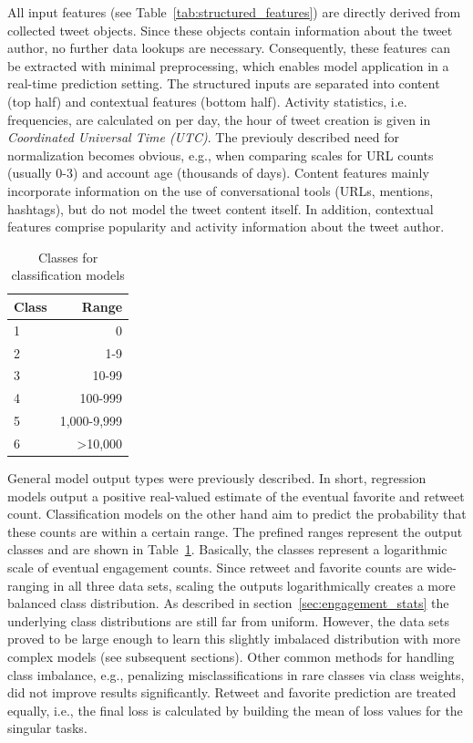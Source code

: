 All input features (see Table~\ref{tab:structured_features}) are directly derived
from collected tweet objects.
Since these objects contain information about the tweet author, no further data lookups
are necessary.
Consequently, these features can be extracted with minimal preprocessing, which
enables model application in a real-time prediction setting.
The structured inputs are separated into content (top half) and contextual
features (bottom half).
Activity statistics, i.e. frequencies, are calculated on per day,
the hour of tweet creation is given in \textit{Coordinated Universal Time (UTC)}.
The previouly described need for normalization becomes obvious, e.g., when
comparing scales for URL counts (usually 0-3) and account age (thousands of days).
Content features mainly incorporate information on the use of conversational
tools (URLs, mentions, hashtags), but do not model the tweet content itself.
In addition, contextual features comprise popularity and activity information
about the tweet author.

\begin{table}
  \begin{tabular}{lr}
    \toprule
    Class & Range \\
    \midrule
    1 & 0 \\
    2 & 1-9 \\
    3 & 10-99 \\
    4 & 100-999 \\
    5 & 1,000-9,999 \\
    6 & >10,000 \\
    \bottomrule
  \end{tabular}
  \caption{Classes for classification models}
  \label{tab:classification_buckets}
\end{table}

General model output types were previously described.
In short, regression models output a positive real-valued estimate of the
eventual favorite and retweet count.
Classification models on the other hand aim to predict the probability that
these counts are within a certain range.
The prefined ranges represent the output classes and are shown in Table~\ref{tab:classification_buckets}.
Basically, the classes represent a logarithmic scale of eventual engagement counts.
Since retweet and favorite counts are wide-ranging in all three data sets,
scaling the outputs logarithmically creates a more balanced class distribution.
As described in section~\ref{sec:engagement_stats} the underlying class distributions
are still far from uniform.
However, the data sets proved to be large enough to learn this slightly 
imbalaced distribution with more complex models (see subsequent sections).
Other common methods for handling class imbalance, e.g., penalizing misclassifications
in rare classes via class weights, did not improve results significantly.
Retweet and favorite prediction are treated equally, i.e., the final loss
is calculated by building the mean of loss values for the singular tasks.

